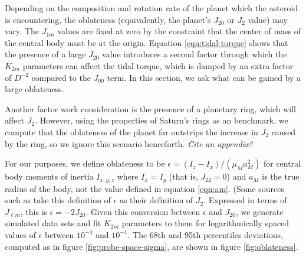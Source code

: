 \documentclass{aastex631}
\newcommand{\jtd}[1]{{\color{red}\textit{#1}}}
\begin{document}
Depending on the composition and rotation rate of the planet which the asteroid is encountering, the oblateness (equivalently, the planet's $J_{20}$ or $J_2$ value) may vary. The $J_{1m}$ values are fixed at zero by the constraint that the center of mass of the central body must be at the origin. Equation \ref{eqn:tidal-torque} shows that the presence of a large $J_{20}$ value introduces a second factor through which the $K_{2m}$ parameters can affect the tidal torque, which is damped by an extra factor of $D^{-2}$ compared to the $J_{00}$ term. In this section, we ask what can be gained by a large oblateness.

Another factor work consideration is the presence of a planetary ring, which will affect $J_{2}$. However, using the properties of Saturn's rings as an benchmark, we compute that the oblateness of the planet far outstrips the increase in $J_{2}$ caused by the ring, so we ignore this scenario henceforth. \jtd{Cite an appendix?}

For our purposes, we define oblateness to be $\epsilon = (I_z - I_x)/(\mu_M a_M^2)$ for central body moments of inertia $I_{x,y,z}$ where $I_x = I_y$ (that is, $J_{22} = 0$) and $a_M$ is the true radius of the body, not the value defined in equation \ref{eqn:am}. (Some sources such as \cite{pater_lissauer_2015} take this definition of $\epsilon$ as their definition of $J_2$. Expressed in terms of $J_{\ell m}$, this is $\epsilon = -2J_{20}$. Given this conversion between $\epsilon$ and $J_{20}$, we generate simulated data sets and fit $K_{2m}$ parameters to them for logarithmically spaced values of $\epsilon$ between $10^{-4}$ and $10^{-1}$. The 68th and 95th percentiles deviations, computed as in figure \ref{fig:probe-space-sigma}, are shown in figure \ref{fig:oblateness}.
\end{document}
